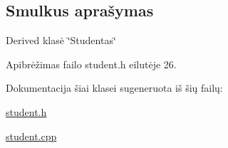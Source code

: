 \subsection{Smulkus aprašymas}
Derived klasė \char`\"{}\+Studentas\char`\"{} 

Apibrėžimas failo student.\+h eilutėje 26.



Dokumentacija šiai klasei sugeneruota iš šių failų\+:\begin{DoxyCompactItemize}
\item 
\hyperlink{student_8h}{student.\+h}\item 
\hyperlink{student_8cpp}{student.\+cpp}\end{DoxyCompactItemize}
